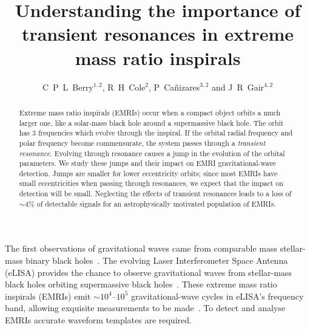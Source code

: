 \documentclass[a4paper]{jpconf}
\begin{document}
\title{Understanding the importance of transient resonances in extreme mass ratio inspirals}

\author{C~P~L~Berry$^{1,2}$, R~H~Cole$^{2}$, P~Ca\~{n}izares$^{3,2}$ and J~R~Gair$^{4,2}$}

\address{$^1$ School of Physics and Astronomy, University of Birmingham, Birmingham, B15 2TT, UK}
\address{$^2$ Institute of Astronomy, Madingley Road, Cambridge, CB3 0HA, UK}
\address{$^3$ Institute of Mathematics, Astrophysics and Particle Physics, Radboud University, Heyendaalseweg 135, 6525 AJ Nijmegen, Netherlands}
\address{$^4$ School of Mathematics, University of Edinburgh, Peter Guthrie Tait Road, Edinburgh EH9 3FD, UK}


\begin{abstract}
Extreme mass ratio inspirals (EMRIs) occur when a compact object orbits a much larger one, like a solar-mass black hole around a supermassive black hole. The orbit has $3$ frequencies which evolve through the inspiral. If the orbital radial frequency and polar frequency become commensurate, the system passes through a \emph{transient resonance}. Evolving through resonance causes a jump in the evolution of the orbital parameters. We study these jumps and their impact on EMRI gravitational-wave detection. Jumps are smaller for lower eccentricity orbits; since most EMRIs have small eccentricities when passing through resonances, we expect that the impact on detection will be small. Neglecting the effects of transient resonances leads to a loss of $\sim4\%$ of detectable signals for an astrophysically motivated population of EMRIs.
\end{abstract}



The first observations of gravitational waves came from comparable mass stellar-mass binary black holes~\cite{Abbott2016d}. The evolving Laser Interferometer Space Antenna (eLISA) provides the chance to observe gravitational waves from stellar-mass black holes orbiting supermassive black holes~\cite{Amaro-Seoane2007}. These extreme mass ratio inspirals (EMRIs) emit $\sim10^4$--$10^5$ gravitational-wave cycles in eLISA's frequency band, allowing exquisite measurements to be made~\cite{Barack2004}. To detect and analyse EMRIs accurate waveform templates are required.
\end{document}
